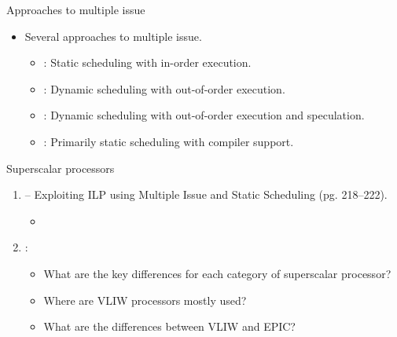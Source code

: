 \begin{frame}[t]{Approaches to multiple issue}
\begin{itemize}
  \item Several approaches to multiple issue.
    \begin{itemize}
      \item {}: 
            Static scheduling with in-order execution.

      \item {}:
            Dynamic scheduling with out-of-order execution.

      \item {}:
            Dynamic scheduling with out-of-order execution and speculation.

      \item {}:
            Primarily static scheduling with compiler support.
    \end{itemize}
\end{itemize}
\end{frame}

\begin{frame}[t]{Superscalar processors}
\begin{enumerate}
  \item {}  --
        Exploiting ILP using Multiple Issue and Static Scheduling
        (pg. 218--222).
    \begin{itemize}
      \item \bibhennessy
    \end{itemize}

  \item {}:
    \begin{itemize}
      \item What are the key differences for each category of superscalar processor?
      \item Where are VLIW processors mostly used?
      \item What are the differences between VLIW and EPIC?
    \end{itemize}
\end{enumerate}
\end{frame}

